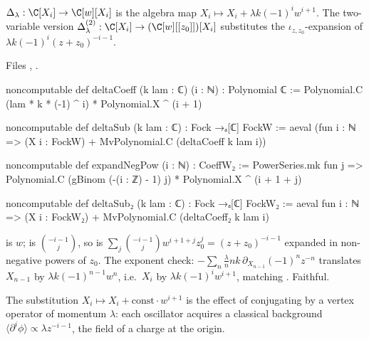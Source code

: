 \begin{definition}\label{l11:def:lidelta}
$\Delta_\lambda:\C[X_i]\to\C[w][X_i]$ is the algebra map $X_i\mapsto X_i+\lambda k(-1)^iw^{i+1}$. The two-variable version
$\Delta_\lambda^{(2)}:\C[X_i]\to(\C[w][[z_0]])[X_i]$ substitutes the $\iota_{z,z_0}$-expansion of $\lambda k(-1)^i(z+z_0)^{-i-1}$.
\end{definition}
\noindent Files , .
\begin{leancode}
noncomputable def deltaCoeff (k lam : ℂ) (i : ℕ) : Polynomial ℂ :=
  Polynomial.C (lam * k * (-1) ^ i) * Polynomial.X ^ (i + 1)

noncomputable def deltaSub (k lam : ℂ) : Fock →ₐ[ℂ] FockW :=
  aeval (fun i : ℕ => (X i : FockW) + MvPolynomial.C (deltaCoeff k lam i))

noncomputable def expandNegPow (i : ℕ) : CoeffW₂ :=
  PowerSeries.mk fun j =>
    Polynomial.C (gBinom (-(i : ℤ) - 1) j) * Polynomial.X ^ (i + 1 + j)

noncomputable def deltaSub₂ (k lam : ℂ) : Fock →ₐ[ℂ] FockW₂ :=
  aeval fun i : ℕ => (X i : FockW₂) + MvPolynomial.C (deltaCoeff₂ k lam i)
\end{leancode}

\begin{dictionary}
 is $w$;  is $\binom{-i-1}j$, so  is
$\sum_j\binom{-i-1}jw^{i+1+j}z_0^j = (z+z_0)^{-i-1}$ expanded in non-negative powers of $z_0$. The exponent check:
$-\sum_n\frac\lambda nnk\,\partial_{X_{n-1}}(-1)^nz^{-n}$ translates $X_{n-1}$ by $\lambda k(-1)^{n-1}w^n$, i.e.\ $X_i$ by
$\lambda k(-1)^iw^{i+1}$, matching . Faithful.
\end{dictionary}

\begin{physics}
The substitution $X_i\mapsto X_i+\text{const}\cdot w^{i+1}$ is the effect of conjugating by a vertex operator of momentum $\lambda$:
each oscillator acquires a classical background $\langle\partial^i\phi\rangle\propto\lambda z^{-i-1}$, the field of a charge at the origin.
\end{physics}


